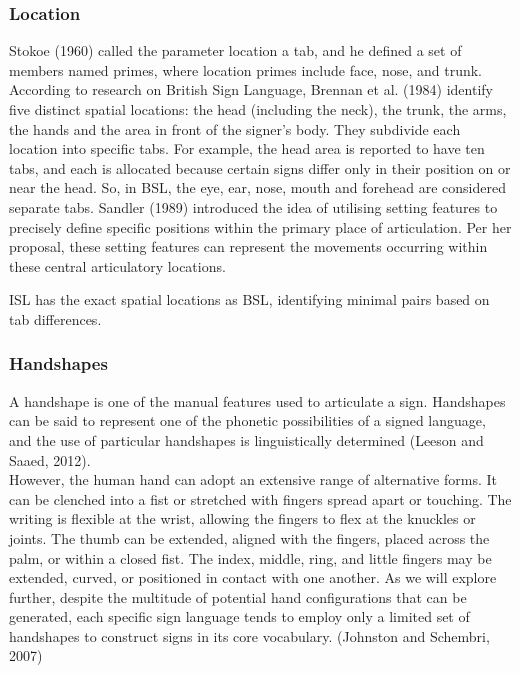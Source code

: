 \subsubsection{Location}

Stokoe (1960) called the parameter location a tab, and he defined a set of members named primes, where location primes include face, nose, and trunk. 
According to research on British Sign Language, Brennan et al. (1984) identify five distinct spatial locations: the head (including the neck), the trunk, the arms, the hands and the area in front of the signer's body. They subdivide each location into specific tabs. For example, the head area is reported to have ten tabs, and each is allocated because certain signs differ only in their position on or near the head. So, in BSL, the eye, ear, nose, mouth and forehead are considered separate tabs. Sandler (1989) introduced the idea of utilising setting features to precisely define specific positions within the primary place of articulation. Per her proposal, these setting features can represent the movements occurring within these central articulatory locations.

ISL has the exact spatial locations as BSL, identifying minimal pairs based on tab differences.

\subsubsection{Handshapes}

A handshape is one of the manual features used to articulate a sign. Handshapes can be said to represent one of the phonetic possibilities of a signed language, and the use of particular handshapes is linguistically determined (Leeson and Saaed, 2012). \\
However, the human hand can adopt an extensive range of alternative forms. It can be clenched into a fist or stretched with fingers spread apart or touching. The writing is flexible at the wrist, allowing the fingers to flex at the knuckles or joints. The thumb can be extended, aligned with the fingers, placed across the palm, or within a closed fist. The index, middle, ring, and little fingers may be extended, curved, or positioned in contact with one another. As we will explore further, despite the multitude of potential hand configurations that can be generated, each specific sign language tends to employ only a limited set of handshapes to construct signs in its core vocabulary. (Johnston and Schembri, 2007)

